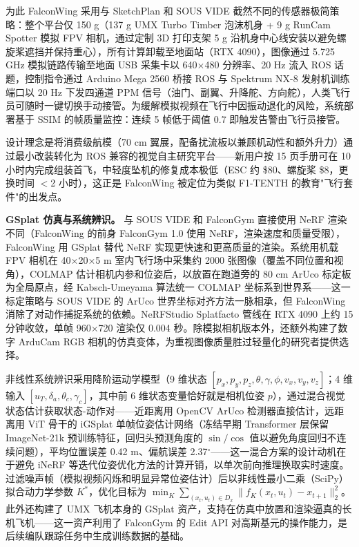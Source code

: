 为此 FalconWing 采用与 SketchPlan 和 SOUS VIDE 截然不同的传感器极简策略：整个平台仅 150 g（137 g UMX Turbo Timber 泡沫机身 + 9 g RunCam Spotter 模拟 FPV 相机，通过定制 3D 打印支架 5 g 沿机身中心线安装以避免螺旋桨遮挡并保持重心），所有计算卸载至地面站（RTX 4090），图像通过 5.725 GHz 模拟链路传输至地面 USB 采集卡以 640$\times$480 分辨率、20 Hz 流入 ROS 话题，控制指令通过 Arduino Mega 2560 桥接 ROS 与 Spektrum NX-8 发射机训练端口以 20 Hz 下发四通道 PPM 信号（油门、副翼、升降舵、方向舵），人类飞行员可随时一键切换手动接管。为缓解模拟视频在飞行中因振动退化的风险，系统部署基于 SSIM 的帧质量监控：连续 5 帧低于阈值 0.7 即触发告警由飞行员接管。

设计理念是将消费级航模（70 cm 翼展，配备扰流板以兼顾机动性和额外升力）通过最小改装转化为 ROS 兼容的视觉自主研究平台——新用户按 15 页手册可在 10 小时内完成组装首飞，中轻度坠机的修复成本极低（ESC 约 \$80、螺旋桨 \$8，更换时间 $<$2 小时），这正是 FalconWing 被定位为类似 F1-TENTH 的教育"飞行套件"的出发点。

\textbf{GSplat 仿真与系统辨识。}
与 SOUS VIDE 和 FalconGym 直接使用 NeRF 渲染不同（FalconWing 的前身 FalconGym 1.0 使用 NeRF，渲染速度和质量受限），FalconWing 用 GSplat 替代 NeRF 实现更快速和更高质量的渲染。系统用机载 FPV 相机在 40$\times$20$\times$5 m 室内飞行场中采集约 2000 张图像（覆盖不同位置和视角），COLMAP 估计相机内参和位姿后，以放置在跑道旁的 80 cm ArUco 标定板为全局原点，经 Kabsch-Umeyama 算法统一 COLMAP 坐标系到世界系——这一标定策略与 SOUS VIDE 的 ArUco 世界坐标对齐方法一脉相承，但 FalconWing 消除了对动作捕捉系统的依赖。NeRFStudio Splatfacto 管线在 RTX 4090 上约 15 分钟收敛，单帧 960$\times$720 渲染仅 0.004 秒。除模拟相机版本外，还额外构建了数字 ArduCam RGB 相机的仿真变体，为重视图像质量胜过轻量化的研究者提供选择。

非线性系统辨识采用降阶运动学模型（9 维状态 $[p_x, p_y, p_z, \theta, \gamma, \phi, v_x, v_y, v_z]$；4 维输入 $[u_T, \delta_a, \theta_c, \gamma_c]$，其中前 6 维状态变量恰好就是相机位姿 $p$），通过混合视觉状态估计获取状态-动作对——近距离用 OpenCV ArUco 检测器直接估计，远距离用 ViT 骨干的 iGSplat 单帧位姿估计网络（冻结早期 Transformer 层保留 ImageNet-21k 预训练特征，回归头预测角度的 $\sin/\cos$ 值以避免角度回归不连续问题），平均位置误差 0.42 m、偏航误差 2.37$^\circ$——这一混合方案的设计动机在于避免 iNeRF 等迭代位姿优化方法的计算开销，以单次前向推理换取实时速度。过滤噪声帧（模拟视频闪烁和明显异常位姿估计）后以非线性最小二乘（SciPy）拟合动力学参数 $K^*$，优化目标为 $\min_K \sum_{(x_t, u_t) \in D_x} \|f_K(x_t, u_t) - x_{t+1}\|_2^2$。此外还构建了 UMX 飞机本身的 GSplat 资产，支持在仿真中放置和渲染逼真的长机飞机——这一资产利用了 FalconGym 的 Edit API 对高斯基元的操作能力，是后续编队跟踪任务中生成训练数据的基础。

